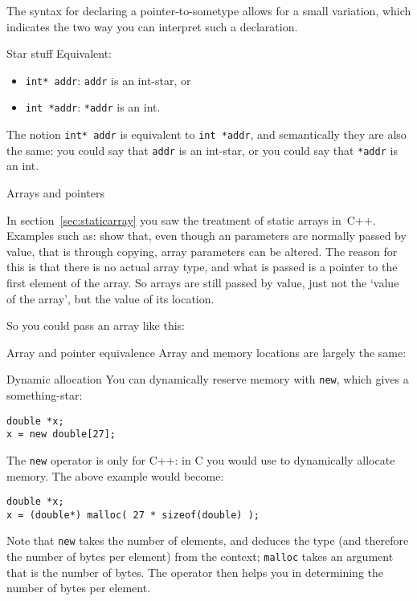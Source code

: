 The syntax for declaring a pointer-to-sometype allows for a small
variation, which indicates the two way you can interpret such a declaration.

\begin{block}{Star stuff}
  \label{sl:starstuff}
  Equivalent:
  \begin{itemize}
  \item \lstinline{int* addr}: \lstinline{addr} is an int-star, or
  \item \lstinline{int *addr}: \lstinline{*addr} is an int.
  \end{itemize}
\end{block}

The notion \lstinline{int* addr} is equivalent to \lstinline{int *addr}, and
semantically they are also the same: you could say that \lstinline{addr} is an
int-star, or you could say that \lstinline{*addr} is an int.

 {Arrays and pointers}
\label{sec:arraypointer}

In section~\ref{sec:staticarray} you saw the treatment of static
arrays in~C++. Examples such as:
%
%
show that, even though an parameters are normally passed by value, that is
through copying, array parameters can be altered. The reason for this
is that there is no actual array type, and what is passed is a pointer
to the first element of the array. So arrays are still passed by
value, just not the `value of the array', but the value of its
location.

So you could pass an array like this:
%

\begin{block}{Array and pointer equivalence}
  \label{sl:array-pointer}
  Array and memory locations are largely the same:
\end{block}

\begin{block}{Dynamic allocation}
  \label{sl:newstar}
  You can dynamically reserve memory with \lstinline{new}, which gives
  a something-star:
\begin{lstlisting}
double *x;
x = new double[27];
\end{lstlisting}
\end{block}

The \lstinline{new} operator is only for C++: 
in C you would use   to dynamically allocate memory.
The above example would become:
\begin{lstlisting}
double *x;
x = (double*) malloc( 27 * sizeof(double) );
\end{lstlisting}
Note that \lstinline{new} takes the number of elements, and deduces
the type (and therefore the number of bytes per element) from the
context; \lstinline{malloc} takes an argument that is the number of
bytes. The  operator then helps you in
determining the number of bytes per element.

